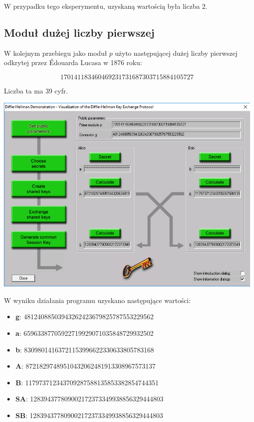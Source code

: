 \documentclass[12pt]{article}
\begin{document}
W przypadku tego eksperymentu, uzyskaną wartością była liczba $2$.

\newpage

\subsection{Moduł dużej liczby pierwszej}

W kolejnym przebiegu jako moduł $p$ użyto następującej dużej liczby pierwszej odkrytej przez Édouarda Lucasa w 1876 roku:

\begin{equation}
	170141183460469231731687303715884105727
\end{equation}

Liczba ta ma 39 cyfr.

\begin{center}
	\includegraphics[scale=0.4]{4-cryptool-2}
\end{center}

W wyniku działania programu uzyskano następujące wartości:
\begin{itemize}
	\item \textbf{g}: 48124088503943262423679825787553229562
	\item \textbf{a}: 65963387705922719929071035848729932502
	\item \textbf{b}: 83098014163721153996622330633805783168
	\item \textbf{A}: 87218297489510432062481913308967573137
	\item \textbf{B}: 117973712343709287588135853382854744351
	\item \textbf{SA}: 128394377809002172373349938856329444803
	\item \textbf{SB}: 128394377809002172373349938856329444803
\end{itemize}
\end{document}
